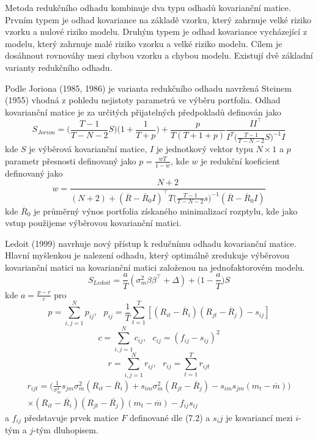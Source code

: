 \documentclass[a4paper]{book}
\begin{document}
Metoda redukčního odhadu kombinuje dva typu odhadů kovarianční matice. Prvním typem je odhad kovariance na základě vzorku, který zahrnuje velké riziko vzorku a nulové riziko modelu. Druhým typem je odhad kovariance vycházející z modelu, který zahrnuje malé riziko vzorku a velké riziko modelu. Cílem je dosáhnout rovnováhy mezi chybou vzorku a chybou modelu. Existují dvě základní varianty redukčního odhadu.

Podle Joriona (1985, 1986) je varianta redukčního odhadu navržená Steinem (1955) vhodná z pohledu nejistoty parametrů ve výběru portfolia. Odhad kovarianční matice je za určitých přijatelných předpokladů definován jako
\begin{equation*}
S_{Jorion} = \Big( \frac{T-1}{T-N-2}S\Big)\Big(1 + \frac{1}{T + p} \Big) + \frac{p}{T(T+1+p)}\frac{II^{\top}}{I^T\Big( \frac{T-1}{T-N-2}S \Big)^{-1}I}
\end{equation*}
kde $S$ je výběrová kovarianční matice, $I$ je jednotkový vektor typu $N \times 1$ a $p$ parametr přesnosti definovaný jako $p = \frac{wT}{1-w}$, kde $w$ je redukční koeficient definovaný jako
\begin{equation*}
w = \frac{N + 2}{(N + 2) + (\overline{R} - \overline{R}_0I)^{\top}T\Big( \frac{T-1}{T-N-2}s\Big)^{-1}(\overline{R} - \overline{R}_0I)}
\end{equation*}
kde $\overline{R}_0$ je průměrný výnos portfolia získaného minimalizací rozptylu, kde jako vstup použijeme výběrovou kovarianční matici.

Ledoit (1999) navrhuje nový přístup k redučnímu odhadu kovarianční matice. Hlavní myšlenkou je nalezení odhadu, který optimálně zredukuje výběrovou kovarianční matici na kovarianční matici založenou na jednofaktorovém modelu.
\begin{equation*}
S_{Ledoit} = \frac{a}{T}(\sigma_m^2 \beta \beta^{\top} + \Delta) + \Big(1 - \frac{a}{T})S
\end{equation*}
kde $a = \frac{p - r}{c}$ pro
\begin{equation*}
p = \sum_{i,j=1}^N p_{ij}, ~~~ p_{ij} = \frac{1}{T}\sum_{t=1}^T[(R_{it} - \overline{R}_i)(R_{jt} - \overline{R}_j) - s_{ij}]
\end{equation*}
\begin{equation*}
c = \sum_{i,j = 1}^N c_{ij}, ~~~ c_{ij} = (f_{ij} - s_{ij})^2
\end{equation*}
\begin{equation*}
r = \sum_{i,j = 1}^N r_{ij}, ~~~ r_{ij} = \sum_{t=1}^T r_{ijt}
\end{equation*}
\begin{equation*}
\begin{split}
r_{ijt} = \Big( \frac{1}{\sigma^4_m}s_{jm}\sigma^2_m(R_{it} - \overline{R}_i) + s_{im}\sigma_m^2(R_{jt} - \overline{R}_j) - s_{im}s_{jm}(m_t - \overline{m})\Big)\\
\times (R_{it} - \overline{R_i})(R_{jt} - \overline{R_j})(m_t - \overline{m}) - f_{ij}s_{ij}
\end{split}
\end{equation*}
a $f_{ij}$ představuje prvek matice $F$ definované dle (7.2) a $s_ij$ je kovariancí mezi $i$-tým a $j$-tým dluhopisem.
\end{document}
